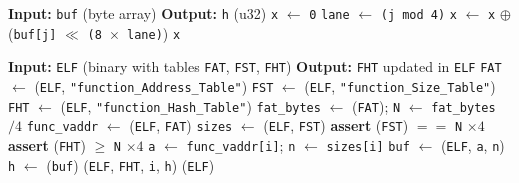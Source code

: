 \begin{algorithm}[H]
\caption{\texttt{xor32(buf)} — 32-bit little-endian XOR, no tail padding}
\label{alg:xor32-no-pad}
\begin{algorithmic}[1]
\State \textbf{Input:} \texttt{buf} (byte array)
\State \textbf{Output:} \texttt{h} (u32)
\State \texttt{x} $\gets$ \texttt{0}
  \State \texttt{lane} $\gets$ \texttt{(j mod 4)} 
  \State \texttt{x} $\gets$ \texttt{x} $\oplus$ \big(\texttt{buf[j]} $\ll$ \texttt{(8 $\times$ lane)}\big)
\EndFor
\State \Return \texttt{x} 
\end{algorithmic}
\end{algorithm}

\begin{algorithm}[H]
\caption{\texttt{populate\_fht(ELF)} — Fill Function Hash Table (FHT) using FAT (vaddrs) and FST (sizes)}
\label{alg:populate-fht}
\begin{algorithmic}[1]
\State \textbf{Input:} \texttt{ELF} (binary with tables \texttt{FAT}, \texttt{FST}, \texttt{FHT})
\State \textbf{Output:} \texttt{FHT} updated in \texttt{ELF}
\State \texttt{FAT} $\gets$ (\texttt{ELF}, \texttt{"function\_Address\_Table"})
\State \texttt{FST} $\gets$ (\texttt{ELF}, \texttt{"function\_Size\_Table"})
\State \texttt{FHT} $\gets$ (\texttt{ELF}, \texttt{"function\_Hash\_Table"})
\State \texttt{fat\_bytes} $\gets$ (\texttt{FAT}); \;\; \texttt{N} $\gets$ \texttt{fat\_bytes} $/ 4$
\State \texttt{func\_vaddr} $\gets$ (\texttt{ELF}, \texttt{FAT})
\State \texttt{sizes}      $\gets$ (\texttt{ELF}, \texttt{FST})
\State \textbf{assert} (\texttt{FST}) $==$ \texttt{N} $\times 4$
\State \textbf{assert} (\texttt{FHT}) $\ge$ \texttt{N} $\times 4$
  \State \texttt{a} $\gets$ \texttt{func\_vaddr[i]}; \;\; \texttt{n} $\gets$ \texttt{sizes[i]}
  \State \texttt{buf} $\gets$ (\texttt{ELF}, \texttt{a}, \texttt{n})
  \State \texttt{h} $\gets$ (\texttt{buf}) 
  \State {}(\texttt{ELF}, \texttt{FHT}, \texttt{i}, \texttt{h})
\EndFor
\State {}(\texttt{ELF})
\end{algorithmic}
\end{algorithm}

